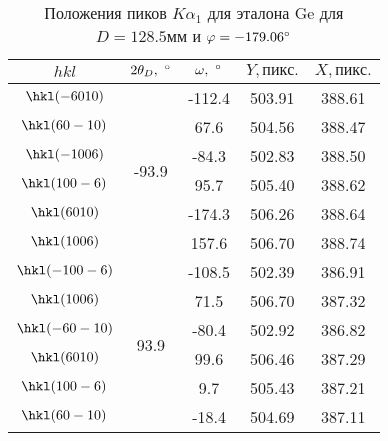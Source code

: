 \begin{table}[ht!]
    \centering
    \begin{tabular}{ |c|c|c|c|c| }
        \hline
                   $hkl$ &  $2\theta_D, \ \degree$ & $\omega, \ \degree$ &    $Y,\unit{пикс.}$ &    $X,\unit{пикс.}$ \\
        \hline
        $ \hkl(-6 0 10)$ &  \multirow{6}{*}{-93.9} &              -112.4 &              503.91 &              388.61 \\
        $ \hkl(6 0 -10)$ &                         &                67.6 &              504.56 &              388.47 \\
        $ \hkl(-10 0 6)$ &                         &               -84.3 &              502.83 &              388.50 \\
        $ \hkl(10 0 -6)$ &                         &                95.7 &              505.40 &              388.62 \\
        $  \hkl(6 0 10)$ &                         &              -174.3 &              506.26 &              388.64 \\
        $  \hkl(10 0 6)$ &                         &               157.6 &              506.70 &              388.74 \\
        \hline
        $\hkl(-10 0 -6)$ &  \multirow{6}{*}{93.9}  &              -108.5 &              502.39 &              386.91 \\
        $  \hkl(10 0 6)$ &                         &                71.5 &              506.70 &              387.32 \\
        $\hkl(-6 0 -10)$ &                         &               -80.4 &              502.92 &              386.82 \\
        $  \hkl(6 0 10)$ &                         &                99.6 &              506.46 &              387.29 \\
        $ \hkl(10 0 -6)$ &                         &                 9.7 &              505.43 &              387.21 \\
        $ \hkl(6 0 -10)$ &                         &               -18.4 &              504.69 &              387.11 \\
        \hline
    \end{tabular}
    \caption{Положения пиков $K\alpha_1$ для эталона Ge для $D = 128.5\unit{мм}$ и $\varphi = -179.06^\circ$}%
    \label{tab:Ge}
\end{table}

